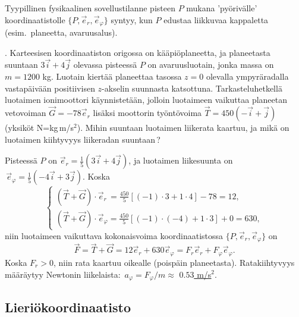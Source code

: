 Tyypillinen fysikaalinen sovellustilanne pisteen $P$ mukana 'pyörivälle' koordinaatistolle 
$\{P,\vec e_r,\vec e_\varphi\}$ syntyy, kun $P$ edustaa  liikkuvaa
kappaletta (esim.\ planeetta, avaruusalus). 
\begin{Exa}  . Karteesisen koordinaatiston
origossa on kääpiöplaneetta, ja planeetasta suuntaan $3\vec i+4\vec j$ olevassa pisteessä $P$
on avaruusluotain, jonka massa on $m=1200$ kg. Luotain kiertää planeettaa tasossa $z=0$
olevalla ympyräradalla vastapäivään positiivisen $z$-akselin suunnasta katsottuna.
Tarkasteluhetkellä luotaimen ionimoottori käynnistetään, jolloin luotaimeen vaikuttaa planeetan
vetovoiman $\vec G=-78\vec e_r$ lisäksi moottorin työntövoima $\vec T=450(-\vec i + \vec j)$
(yksiköt N=kg\,m/s$^2$). Mihin suuntaan luotaimen liikerata kaartuu, ja mikä on luotaimen
kiihtyvyys liikeradan suuntaan\,?
\end{Exa}
\ratk Pisteessä $P$ on $\vec e_r = \frac{1}{5}(3\vec i + 4\vec j)$, ja luotaimen liikesuunta on 
$\,\vec e_\varphi = \frac{1}{5}(-4\vec i + 3\vec j)$. Koska
\[ \begin{cases}
(\vec T + \vec G) \cdot \vec e_r\,    = \frac{450}{5}[(-1) \cdot 3 + 1 \cdot 4] - 78 = 12, \\
(\vec T + \vec G) \cdot \vec e_\varphi = \frac{450}{5}[(-1)\cdot(-4)+1 \cdot 3] + 0  = 630,
\end{cases} \] 
niin luotaimeen vaikuttava kokonaisvoima koordinaatistossa $\{P,\vec e_r,\vec e_\varphi\}$ on
\[
\vec F = \vec T + \vec G = 12 \vec e_r + 630 \vec e_\varphi 
                         = F_r\vec e_r + F_\varphi\vec e_\varphi.
\]
Koska $F_r>0$, niin rata kaartuu oikealle (poispäin planeetasta). Ratakiihtyvyys määräytyy
Newtonin liikelaista: $\,a_\varphi = F_\varphi/m \approx$ \underline{\underline{$0.53$ m/s$^2$}}.
\loppu

\subsection*{Lieriökoordinaatisto}

